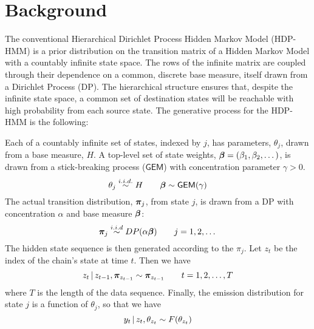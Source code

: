 \section{Background}

The conventional Hierarchical Dirichlet Process Hidden Markov Model
(HDP-HMM) \cite{teh2006hierarchical} 
is a prior distribution on the transition matrix of a Hidden Markov
Model with a countably infinite state space.  The rows of the
infinite matrix are coupled through their dependence on a common, discrete base measure,
itself drawn from a Dirichlet Process (DP).
The hierarchical structure ensures that, despite the infinite state
space, a common set of destination states will be reachable with high probability
from each source state.  The generative process for the HDP-HMM is the following:

Each of a countably infinite set of states, indexed by $j$, has parameters,
$\theta_j$, drawn from a base measure, $H$.  A top-level
set of state weights, $\boldsymbol{\beta} = (\beta_1, \beta_2, \dots)$, is drawn from a stick-breaking
process ($\mathsf{GEM}$) with concentration parameter $\gamma > 0$.
\begin{equation}
\theta_j \stackrel{i.i.d.}{\sim} H \qquad \boldsymbol{\beta} \sim \mathsf{GEM}(\gamma)
\end{equation}
The actual transition distribution, $\boldsymbol{\pi}_j$, from state $j$,
is drawn from a DP with concentration $\alpha$ and base measure $\boldsymbol{\beta}$:
\begin{equation}
  \label{eq:1}
  \boldsymbol{\pi}_j \stackrel{i.i.d}{\sim} DP(\alpha \boldsymbol{\beta}) \qquad j = 1, 2, \dots
\end{equation}
The hidden state sequence is then generated according to the $\pi_j$.
Let $z_t$ be the index of the chain's state at time $t$.  Then we have
\begin{equation}
  \label{eq:4}
  z_t \, \vert \, z_{t-1}, \boldsymbol{\pi}_{z_{t-1}} \sim \boldsymbol{\pi}_{z_{t-1}} \qquad t = 1, 2, \dots, T
\end{equation}
where $T$ is the length of the data sequence.  Finally, the emission distribution 
for state $j$ is a function of $\theta_j$, so that we have
\begin{equation}
  \label{eq:5}
  y_t \, \vert \, z_{t}, \theta_{z_t} \sim F(\theta_{z_t})
\end{equation}

